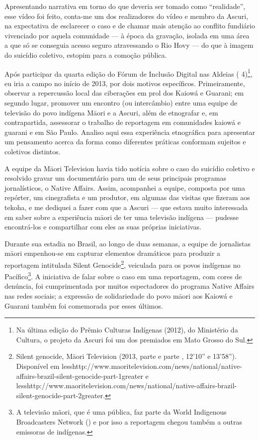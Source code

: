 Apresentando narrativa em torno do que deveria ser tomado como
``realidade'', esse vídeo foi feito, conta-me um dos realizadores do
vídeo e membro da Ascuri, na expectativa de esclarecer o caso e de
chamar mais atenção ao conflito fundiário vivenciado por aquela
comunidade --- à época da gravação, isolada em uma área a que só se
conseguia acesso seguro atravessando o Rio Hovy --- do que à imagem do
suicídio coletivo, estopim para a comoção pública.

Após participar da quarta edição do Fórum de Inclusão Digital nas
Aldeias ( 4)\footnote{Na última edição do Prêmio Culturas Indígenas
(2012), do Ministério da Cultura, o projeto da Ascuri foi um dos
premiados em Mato Grosso do Sul.}, eu iria a campo no início de 2013,
por dois motivos específicos. Primeiramente, observar a repercussão
local das ciberações em prol dos Kaiowá e Guarani; em segundo lugar,
promover um encontro (ou intercâmbio) entre uma equipe de televisão do
povo indígena M\=aori e a Ascuri, além de etnografar e, em
contrapartida, assessorar o trabalho de reportagem em comunidades
kaiowá e guarani e em São Paulo. Analiso aqui essa experiência
etnográfica para apresentar um pensamento acerca da forma como
diferentes práticas conformam sujeitos e coletivos distintos.

A equipe da M\=aori Television havia tido notícia sobre o caso do
suicídio coletivo e resolvido gravar um documentário para um de seus
principais programas jornalísticos, o Native Affairs. Assim, acompanhei
a equipe, composta por uma repórter, um cinegrafista e um produtor, em
algumas das visitas que fizeram aos tekoha, e me dediquei a fazer com
que a Ascuri --- que estava muito interessada em saber sobre a
experiência m\=aori de ter uma televisão indígena --- pudesse
encontrá-los e compartilhar com eles as suas próprias iniciativas.

Durante sua estadia no Brasil, ao longo de duas semanas, a equipe de
jornalistas m\=aori empenhou-se em capturar elementos dramáticos para
produzir a reportagem intitulada Silent Genocide\footnote{Silent
genocide, M\=aori Television (2013, parte  e parte ,
12'10'' e
13'58''). Disponível %
em
{less}http://www.maoritelevision.com/news/national/native-affairs-brazil-silent-genocide-part-1{greater}
e
{less}http://www.maoritelevision.com/news/national/native-affairs-brazil-silent-genocide-part-2{greater}.},
veiculada para os povos indígenas no Pacífico\footnote{A televisão
mãori, que é uma  pública, faz parte da World Indigenous Broadcasters
Network () e por isso a reportagem chegou também a outras
emissoras de  indígenas. }. A iniciativa de falar sobre o caso em uma
reportagem, com cores de denúncia, foi cumprimentada por muitos
espectadores do programa Native Affairs nas redes sociais; a expressão
de solidariedade do povo m\=aori aos Kaiowá e Guarani também foi
comemorada por esses últimos.

